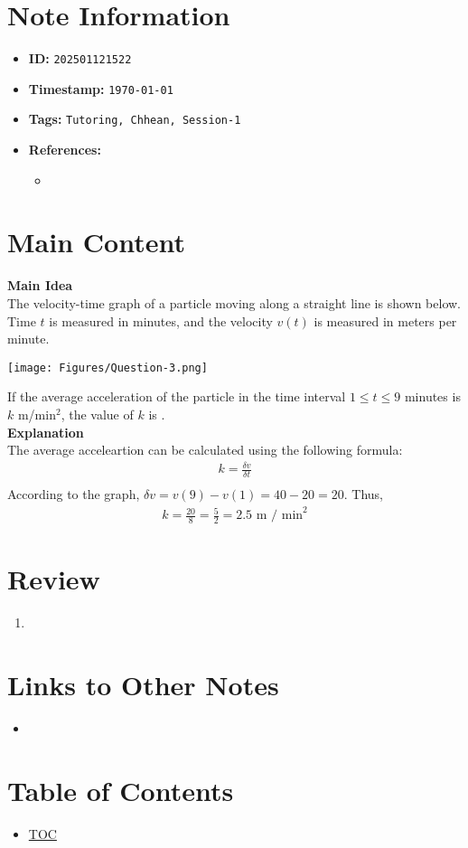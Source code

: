 \clearpage
{}
\label{202501121522}
\renewcommand{\notetitle}{Question-3}

\section*{Note Information}
\begin{itemize}
  \item \textbf{ID:} \texttt{202501121522}
  \item \textbf{Timestamp:} \texttt{\today \ \currenttime}
  \item \textbf{Tags:} \texttt{Tutoring, Chhean, Session-1}
  \item \textbf{References:}
    \begin{itemize}
      \item \href{}{}
    \end{itemize}
\end{itemize}


\section*{Main Content}
\textbf{Main Idea}\\
The velocity-time graph of a particle moving along a straight line is shown below. Time $t$ is measured in minutes, and the velocity $v(t)$ is measured in meters per minute.
\begin{center}
  \texttt{[image: Figures/Question-3.png]}
\end{center}
If the average acceleration of the particle in the time interval $1 \leq t \leq 9$ minutes is $k$ m/min$^2$, the value of $k$ is .\\
\textbf{Explanation}\\
The average acceleartion can be calculated using the following formula:
\begin{align*}
  k = \frac{\delta v}{\delta t}\\ 
\end{align*}
According to the graph, $\delta v = v(9) - v(1) = 40-20 = 20$. Thus,
\begin{align*}
  k = \frac{20}{8} = \frac{5}{2} = 2.5 \text{ m / min}^2
\end{align*}


\section*{Review}
\begin{enumerate}
  \item 
\end{enumerate}


\section*{Links to Other Notes}
\begin{itemize}
  \item \hyperref[]{}
\end{itemize}

\section*{Table of Contents}

\begin{itemize}
  \item \hyperref[toc]{TOC}
\end{itemize}

